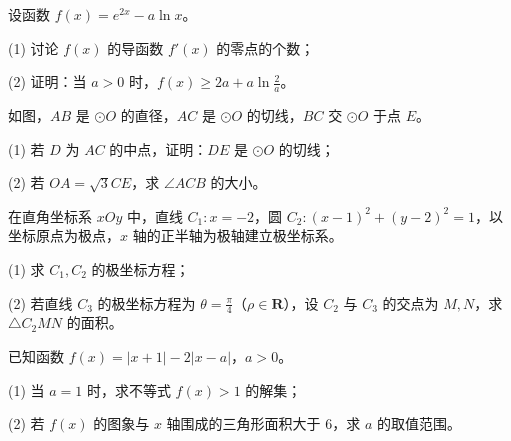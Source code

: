 \begin{question}
设函数 $f(x)=e^{2x}-a\ln x$。

(1) 讨论 $f(x)$ 的导函数 $f'(x)$ 的零点的个数；

(2) 证明：当 $a>0$ 时，$f(x)\geqslant2a+a\ln\frac2a$。

\Needspace{0.4\textheight}
\end{question}
\begin{question}
如图，$AB$ 是 $\odot O$ 的直径，$AC$ 是 $\odot O$ 的切线，$BC$ 交 $\odot O$ 于点 $E$。

(1) 若 $D$ 为 $AC$ 的中点，证明：$DE$ 是 $\odot O$ 的切线；

(2) 若 $OA=\sqrt3 CE$，求 $\angle ACB$ 的大小。
\nopagebreak[4]
\begin{center}\end{center}
\nopagebreak[4]
\end{question}
\begin{question}
在直角坐标系 $xOy$ 中，直线 $C_1:x=-2$，圆 $C_2:(x-1)^2+(y-2)^2=1$，以坐标原点为极点，$x$ 轴的正半轴为极轴建立极坐标系。

(1) 求 $C_1,C_2$ 的极坐标方程；

(2) 若直线 $C_3$ 的极坐标方程为 $\theta=\frac\pi4$（$\rho\in\mathbf R$），设 $C_2$ 与 $C_3$ 的交点为 $M,N$，求 $\triangle C_2MN$ 的面积。

\end{question}
\begin{question}
已知函数 $f(x)=|x+1|-2|x-a|$，$a>0$。

(1) 当 $a=1$ 时，求不等式 $f(x)>1$ 的解集；

(2) 若 $f(x)$ 的图象与 $x$ 轴围成的三角形面积大于 6，求 $a$ 的取值范围。

\end{question}